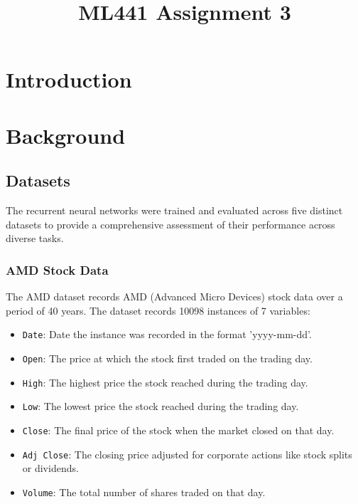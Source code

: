 \documentclass[conference]{IEEEtran}
\begin{document}
\title{ML441 Assignment 3}

\author{
}

\maketitle

\begin{abstract}

\end{abstract}

\section{\textbf{Introduction}}

\section{\textbf{Background}}

\subsection{\textbf{Datasets}}

The recurrent neural networks were trained and evaluated across five distinct datasets to provide a comprehensive assessment of their performance across diverse tasks.

\subsubsection{\textbf{AMD Stock Data}}

The AMD dataset records AMD (Advanced Micro Devices) stock data over a period of 40 years. The dataset records 10098 instances of 7 variables:

\begin{itemize}
    \item \texttt{Date}: Date the instance was recorded in the format 'yyyy-mm-dd'.
    \item \texttt{Open}: The price at which the stock first traded on the trading day.
    \item \texttt{High}: The highest price the stock reached during the trading day.
    \item \texttt{Low}: The lowest price the stock reached during the trading day.
    \item \texttt{Close}: The final price of the stock when the market closed on that day.
    \item \texttt{Adj Close}: The closing price adjusted for corporate actions like stock splits or dividends.
    \item \texttt{Volume}: The total number of shares traded on that day.
\end{itemize}
\end{document}
